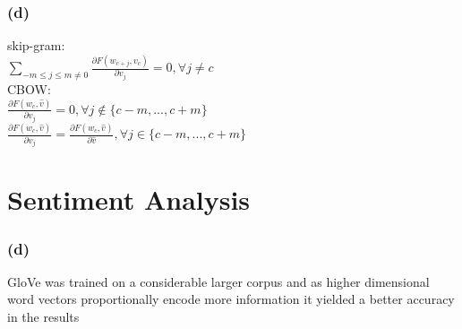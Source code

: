 \documentclass{article}
\begin{document}
\subsubsection*{(d)}
\begin{center}

    skip-gram: \\[7pt]
    $\sum_{-m\leq j \leq m \neq 0} \frac{\partial F(w_{c+j}, v_c)}{\partial v_j} = 0, \forall j \neq c $\\[10pt]
    CBOW: \\[7pt]
    $\frac{\partial F(w_{c}, \hat{v})}{\partial v_j} = 0, \forall j \notin \{c-m,...,c+m\}$ \\[5pt]
    $\frac{\partial F(w_{c}, \hat{v})}{\partial v_j} = \frac{\partial F(w_{c}, \hat{v})}{\partial \hat{v}}, \forall j \in \{c-m,...,c+m\}$
    
\end{center}

\section{Sentiment Analysis}
\subsubsection*{(d)}
    \textnormal{GloVe was trained on a considerable larger corpus and as higher dimensional word vectors proportionally encode more information it yielded a better accuracy in the results}
\end{document}
